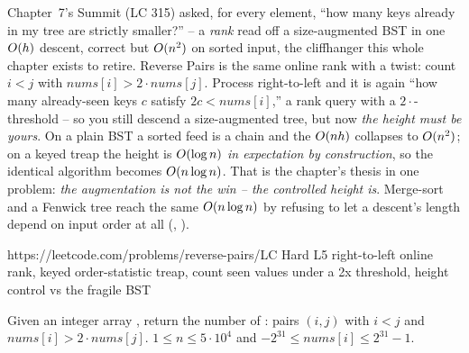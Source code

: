 
\begin{notebox}
Chapter~7's Summit (LC 315) asked, for every element, ``how many keys already in my tree are strictly
smaller?'' -- a \emph{rank} read off a size-augmented BST in one $O(h)$ descent, correct but
$O(n^2)$ on sorted input, the cliffhanger this whole chapter exists to retire. Reverse Pairs is the
same online rank with a twist: count $i<j$ with $\mathit{nums}[i]>2\cdot\mathit{nums}[j]$. Process
right-to-left and it is again ``how many already-seen keys $c$ satisfy $2c<\mathit{nums}[i]$,'' a rank
query with a $2\cdot$-threshold -- so you still descend a size-augmented tree, but now \emph{the height must
be yours}. On a plain BST a sorted feed is a chain and the $O(nh)$ collapses to $O(n^2)$; on a keyed
treap the height is $O(\log n)$ \emph{in expectation by construction}, so the identical algorithm becomes
$O(n\log n)$. That is the chapter's thesis in one problem: \emph{the augmentation is not the win -- the
controlled height is}. Merge-sort and a Fenwick tree reach the same $O(n\log n)$ by refusing to let a
descent's length depend on input order at all (, ).
\end{notebox}

  {https://leetcode.com/problems/reverse-pairs/}{LC Hard L5}
  {right-to-left online rank, keyed order-statistic treap, count seen values under a 2x threshold, height control vs the fragile BST}

\begin{problemstatement}
Given an integer array , return the number of : pairs $(i,j)$ with
$i<j$ and $\mathit{nums}[i] > 2\cdot\mathit{nums}[j]$. $1\le n\le 5\cdot 10^{4}$ and
$-2^{31}\le \mathit{nums}[i]\le 2^{31}-1$.
\end{problemstatement}

